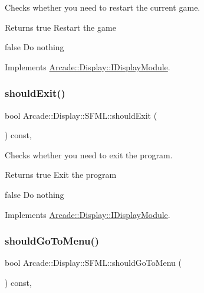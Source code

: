 Checks whether you need to restart the current game. 

\begin{DoxyReturn}{Returns}
true Restart the game 

false Do nothing 
\end{DoxyReturn}


Implements \mbox{\hyperlink{classArcade_1_1Display_1_1IDisplayModule_adc5d499229aa5899bbd4bae14f00cb27}{Arcade\+::\+Display\+::\+I\+Display\+Module}}.

\mbox{\label{classArcade_1_1Display_1_1SFML_a780a71713551c8dffd1f008802f96767}} 
\subsubsection{\texorpdfstring{shouldExit()}{shouldExit()}}
{\footnotesize\ttfamily bool Arcade\+::\+Display\+::\+S\+F\+M\+L\+::should\+Exit (\begin{DoxyParamCaption}{ }\end{DoxyParamCaption}) const\hspace{0.3cm}{\ttfamily [final]}, {\ttfamily [virtual]}}



Checks whether you need to exit the program. 

\begin{DoxyReturn}{Returns}
true Exit the program 

false Do nothing 
\end{DoxyReturn}


Implements \mbox{\hyperlink{classArcade_1_1Display_1_1IDisplayModule_a550877fb92d58325404b9ebe9e71f6ff}{Arcade\+::\+Display\+::\+I\+Display\+Module}}.

\mbox{\label{classArcade_1_1Display_1_1SFML_a3072fbe4dd92685154da10cbd602bc3b}} 
\subsubsection{\texorpdfstring{shouldGoToMenu()}{shouldGoToMenu()}}
{\footnotesize\ttfamily bool Arcade\+::\+Display\+::\+S\+F\+M\+L\+::should\+Go\+To\+Menu (\begin{DoxyParamCaption}{ }\end{DoxyParamCaption}) const\hspace{0.3cm}{\ttfamily [final]}, {\ttfamily [virtual]}}



